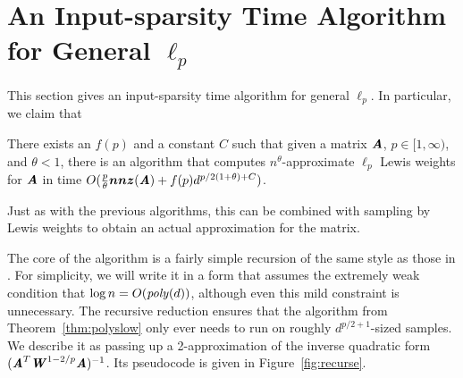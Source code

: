 
\section{An Input-sparsity Time Algorithm for General $\ell_p$}
\label{sec:sparseconvex}

This section gives an input-sparsity time algorithm for general $\ell_p$.
In particular, we claim that

\begin{theorem}
\label{thm:sparseconvex}
There exists an $f(p)$ and a constant $C$ such that given a matrix $\AA$, $p \in [1, \infty)$,
and $\theta < 1$, there is an algorithm that computes $n^\theta$-approximate $\ell_p$ Lewis
weights for $\AA$ in time $O(\frac{p}{\theta} \nnz(\AA) + f(p) d^{p/2 (1 + \theta) + C})$.
\end{theorem}

Just as with the previous algorithms, this can be combined with sampling by Lewis
weights to obtain an actual approximation for the matrix.

The core of the algorithm is a fairly simple recursion of the same style as
those in \cite{CohenLMMPS14:arxiv}.  For simplicity, we will write it in a form
that assumes the extremely weak condition that $\log n = O(\poly(d))$, although
even this mild constraint is unnecessary.  The recursive reduction ensures
that the algorithm from Theorem~\ref{thm:polyslow} only ever needs to run on
roughly $d^{p/2+1}$-sized samples.  We describe it as passing up a 2-approximation
of the inverse quadratic form $(\AA^T \WW^{1-2/p} \AA)^{-1}$.
Its pseudocode is given in Figure~\ref{fig:recurse}.

